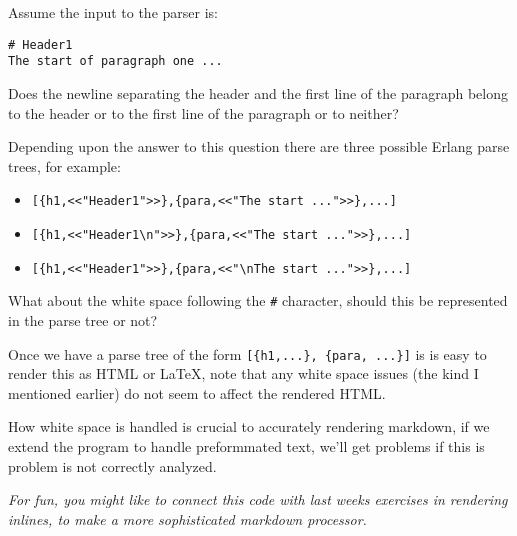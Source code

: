 ﻿\documentclass[12pt]{hitec}
\begin{document}
Assume the input to the parser is:

\begin{Verbatim}
# Header1
The start of paragraph one ...
\end{Verbatim}

Does the newline separating the header and the first line of the
paragraph belong to the header or to the first line of the paragraph or
to neither?

Depending upon the answer to this question there are three possible
Erlang  parse trees, for example:

\begin{itemize}
\item \verb+[{h1,<<"Header1">>},{para,<<"The start ...">>},...]+
\item \verb+[{h1,<<"Header1\n">>},{para,<<"The start ...">>},...]+
\item \verb+[{h1,<<"Header1">>},{para,<<"\nThe start ...">>},...]+
\end{itemize}

What about the white space following the \verb+#+ character,
should this be represented in the parse tree or not?

Once we have a parse tree of the form \verb+[{h1,...}, {para, ...}]+
is is easy to render this as HTML or \LaTeX{}, note that any white
space issues (the kind I mentioned earlier) do not seem to affect the
rendered HTML.

How white space is handled is crucial to accurately rendering markdown,
if we extend the program to handle preformmated text, we'll get
problems if this is problem is not correctly analyzed.

{\sl For fun, you might like to connect this code with last weeks
  exercises in rendering inlines, to make a more sophisticated markdown
  processor.}
\end{document}
